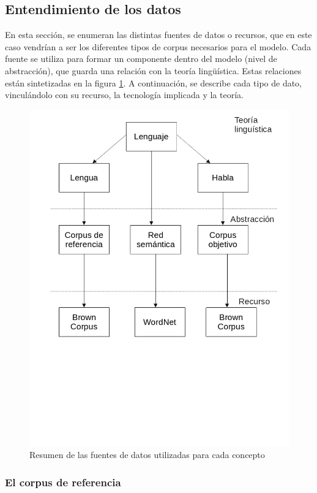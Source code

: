 \documentclass[12pt,letterpaper,twoside]{article}
\begin{document}
\subsection{Entendimiento de los datos}
\label{sec:org3af1dc1}

En esta sección, se enumeran las distintas fuentes de datos o
recursos, que en este caso vendrían a ser los diferentes tipos de
corpus necesarios para el modelo. Cada fuente se utiliza para
formar un componente dentro del modelo (nivel de abstracción), que
guarda una relación con la teoría lingüística.  Estas relaciones
están sintetizadas en la figura \ref{fig:org49babec}.
A continuación, se describe cada tipo de dato, vinculándolo con su
recurso, la tecnología implicada y la teoría.

\begin{figure}[htbp]
\centering
\includegraphics[width=.9\linewidth]{./assets/entendimiento_de_los_datos.png}
\caption{\label{fig:org49babec}Resumen de las fuentes de datos utilizadas para cada concepto}
\end{figure}



\subsubsection{El corpus de referencia}
\label{sec:org42b2036}
\end{document}
